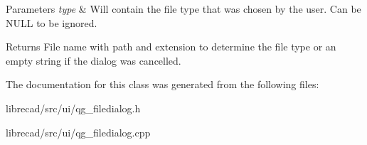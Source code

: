 \begin{DoxyParams}{Parameters}
{\em type} & Will contain the file type that was chosen by the user. Can be N\-U\-L\-L to be ignored.\\
\hline
\end{DoxyParams}
\begin{DoxyReturn}{Returns}
File name with path and extension to determine the file type or an empty string if the dialog was cancelled. 
\end{DoxyReturn}


The documentation for this class was generated from the following files\-:\begin{DoxyCompactItemize}
\item 
librecad/src/ui/qg\-\_\-filedialog.\-h\item 
librecad/src/ui/qg\-\_\-filedialog.\-cpp\end{DoxyCompactItemize}

